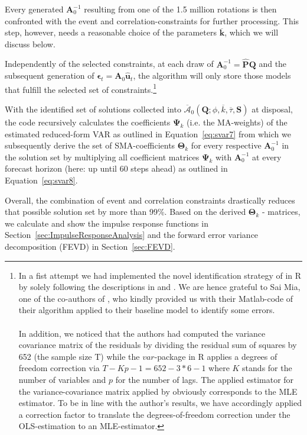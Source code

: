\documentclass[a4paper,11pt,listof=nochaptergap,oneside,pointednumbers,bibtotoc,bigheadings,liststotoc,hidelinks]{scrbook}
\theoremstyle{mysatz}
\theoremstyle{mydefinition}
\theoremstyle{mytheorem}
\theoremstyle{mybemerkung}
\let\oldhat\hat
\newcommand{\vect}[1]{\boldsymbol{\mathbf{#1}}}
\newcommand{\hatt}[1]{\oldhat{\boldsymbol{\mathbf{#1}}}}
\begin{document}
Every generated $\vect{A}_0^{-1}$ resulting from one of the 1.5 million rotations is then confronted with the event and correlation-constraints for further processing. This step, however, needs a reasonable choice of the parameters $\overline{\vect{k}}$, which we will discuss below.

Independently of the selected constraints, at each draw of $\vect{A}_0^{-1} = \hatt{\vect{P}}\vect{Q}$ and the subsequent generation of $\vect{\epsilon}_t = \vect{A}_0\hatt{\vect{u}}_t$, the algorithm will only store those models that fulfill the selected set of constraints.\footnote{In a fist attempt we had implemented the novel identification strategy of \citet{ludvigsonetal:18} in R by solely following the descriptions in \citet{ludvigsonetal:18} and \citet{ludvigsonetal:17}. We are hence grateful to Sai Mia, one of the co-authors of \citet{ludvigsonetal:18,ludvigsonetal:19}, who kindly provided us with their Matlab-code of their algorithm applied to their baseline model to identify some errors.\\
\\
In addition, we noticed that the authors had computed the variance covariance matrix of the residuals by dividing the residual sum of squares by 652 (the sample size T) while the $var$-package in R applies a degrees of freedom correction via $T-Kp-1 = 652 - 3*6 - 1$ where $K$ stands for the number of variables and $p$ for the number of lags. The applied estimator for the variance-covariance matrix applied by \citet{ludvigsonetal:18} obviously corresponds to the MLE estimator. To be in line with the author's results, we have accordingly applied a correction factor to translate the degrees-of-freedom correction under the OLS-estimation to an MLE-estimator.\label{ftn:MatlabCodeFootnote}}

With the identified set of solutions collected into $\overline{\vect{\mathcal{A}}}_0(\vect{Q}; \phi, \overline{k}, \overline{\tau}, \vect{S})$ at disposal, the code recursively calculates the coefficients $\vect{\Psi}_k$ (i.e. the MA-weights) of the estimated reduced-form VAR as outlined in Equation~\ref{eq:svar7} from which we subsequently derive the set of SMA-coefficients $\vect{\Theta}_k$ for every respective $\vect{A}_{0}^{-1}$ in the solution set by multiplying all coefficient matrices $\vect{\Psi}_k$ with $\vect{A}_{0}^{-1}$ at every forecast horizon (here: up until 60 steps ahead) as outlined in Equation~\ref{eq:svar8}.

Overall, the combination of event and correlation constraints drastically reduces that possible solution set by more than 99\%. Based on the derived  $\vect{\Theta}_k$ - matrices, we calculate and show the impulse response functions in Section~\ref{sec:ImpulseResponseAnalysis} and the forward error variance decomposition (FEVD) in Section~\ref{sec:FEVD}.\\
\end{document}
